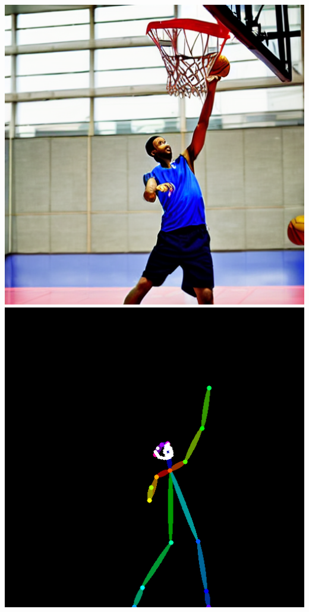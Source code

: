 \documentclass{article}
\begin{document}
\begin{center}
    \includegraphics[scale=0.2]{.imgs/basketball_base.png}
    \includegraphics[scale=0.2]{.imgs/basketball_pose.png}

\end{center}
\end{document}
